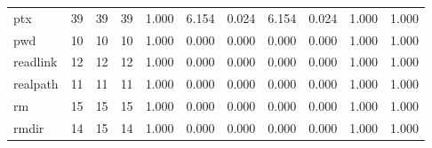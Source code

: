 \begin{longtable}{lp{1.2cm}p{1.2cm}p{1.2cm}p{1.2cm}p{1.2cm}p{1.2cm}p{1.2cm}p{1.2cm}p{1.2cm}p{1.2cm}}
ptx       &                           39 &                 39 &                                39 &                                      1.000 &                                  6.154 &                                        0.024 &                             6.154 &                                   0.024 &                              1.000 &                                              1.000 \\
pwd       &                           10 &                 10 &                                10 &                                      1.000 &                                  0.000 &                                        0.000 &                             0.000 &                                   0.000 &                              1.000 &                                              1.000 \\
readlink  &                           12 &                 12 &                                12 &                                      1.000 &                                  0.000 &                                        0.000 &                             0.000 &                                   0.000 &                              1.000 &                                              1.000 \\
realpath  &                           11 &                 11 &                                11 &                                      1.000 &                                  0.000 &                                        0.000 &                             0.000 &                                   0.000 &                              1.000 &                                              1.000 \\
rm        &                           15 &                 15 &                                15 &                                      1.000 &                                  0.000 &                                        0.000 &                             0.000 &                                   0.000 &                              1.000 &                                              1.000 \\
rmdir     &                           14 &                 15 &                                14 &                                      1.000 &                                  0.000 &                                        0.000 &                             0.000 &                                   0.000 &                              1.000 &                                              1.000 \\

\end{longtable}
